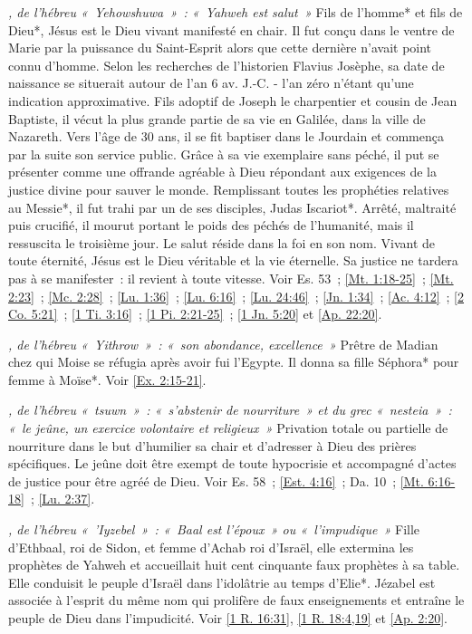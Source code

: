 \begin{multicols}{2}
\textit{, de l'hébreu «~Yehowshuwa~»~: «~Yahweh est salut~»}\newline
Fils de l'homme* et fils de Dieu*, Jésus est le Dieu vivant manifesté en chair. Il fut conçu dans le ventre de Marie par la puissance du Saint-Esprit alors que cette dernière n'avait point connu d'homme. Selon les recherches de l'historien Flavius Josèphe, sa date de naissance se situerait autour de l'an 6 av. J.-C. - l'an zéro n'étant qu'une indication approximative. Fils adoptif de Joseph le charpentier et cousin de Jean Baptiste, il vécut la plus grande partie de sa vie en Galilée, dans la ville de Nazareth. Vers l'âge de 30 ans, il se fit baptiser dans le Jourdain et commença par la suite son service public. Grâce à sa vie exemplaire sans péché, il put se présenter comme une offrande agréable à Dieu répondant aux exigences de la justice divine pour sauver le monde. Remplissant toutes les prophéties relatives au Messie*, il fut trahi par un de ses disciples, Judas Iscariot*. Arrêté, maltraité puis crucifié, il mourut portant le poids des péchés de l'humanité, mais il ressuscita le troisième jour. Le salut réside dans la foi en son nom. Vivant de toute éternité, Jésus est le Dieu véritable et la vie éternelle. Sa justice ne tardera pas à se manifester~: il revient à toute vitesse. Voir Es. 53~; \vref{Mt. 1:18-25}~; \vref{Mt. 2:23}~; \vref{Mc. 2:28}~; \vref{Lu. 1:36}~; \vref{Lu. 6:16}~; \vref{Lu. 24:46}~; \vref{Jn. 1:34}~; \vref{Ac. 4:12}~; \vref{2 Co. 5:21}~; \vref{1 Ti. 3:16}~; \vref{1 Pi. 2:21-25}~; \vref{1 Jn. 5:20} et \vref{Ap. 22:20}.

\textit{, de l'hébreu «~Yithrow~»~: «~son abondance, excellence~»}\newline
Prêtre de Madian chez qui Moise se réfugia après avoir fui l'Egypte. Il donna sa fille Séphora* pour femme à Moïse*. Voir \vref{Ex. 2:15-21}.

\textit{, de l'hébreu «~tsuwn~»~: «~s'abstenir de nourriture~» et du grec «~nesteia~»~: «~le jeûne, un exercice volontaire et religieux~»}\newline
Privation totale ou partielle de nourriture dans le but d'humilier sa chair et d'adresser à Dieu des prières spécifiques. Le jeûne doit être exempt de toute hypocrisie et accompagné d'actes de justice pour être agréé de Dieu. Voir Es. 58~; \vref{Est. 4:16}~; Da. 10~; \vref{Mt. 6:16-18}~; \vref{Lu. 2:37}.

\textit{, de l'hébreu «~'Iyzebel~»~: «~Baal est l'époux~» ou «~l'impudique~»}\newline
Fille d'Ethbaal, roi de Sidon, et femme d'Achab roi d'Israël, elle extermina les prophètes de Yahweh et accueillait huit cent cinquante faux prophètes à sa table. Elle conduisit le peuple d'Israël dans l'idolâtrie au temps d'Elie*. Jézabel est associée à l'esprit du même nom qui prolifère de faux enseignements et entraîne le peuple de Dieu dans l'impudicité. Voir \vref{1 R. 16:31}, \vref{1 R. 18:4,19} et \vref{Ap. 2:20}.


\end{multicols}

